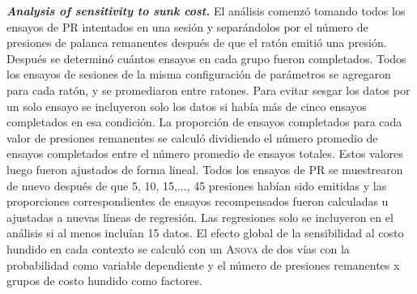 \documentclass[a4paper,12pt]{article}
\begin{document}
{\itshape\bfseries Analysis of sensitivity to sunk cost.} El análisis comenzó tomando todos los ensayos de PR intentados en una sesión y separándolos por el número de presiones de palanca remanentes después de que el ratón emitió una presión. Después se determinó cuántos ensayos en cada grupo fueron completados. Todos los ensayos de sesiones de la misma configuración de parámetros se agregaron para cada ratón, y se promediaron entre ratones. Para evitar sesgar  los datos por un solo ensayo se incluyeron solo los datos si había más de cinco ensayos completados en esa condición. La proporción de ensayos completados para cada valor de presiones remanentes se calculó dividiendo el número promedio de ensayos completados entre el número promedio de ensayos totales. Estos valores luego fueron ajustados de forma lineal. Todos los ensayos de PR se muestrearon de nuevo después de que 5, 10, 15,..., 45 presiones habían sido emitidas y las proporciones correspondientes de ensayos recompensados fueron calculadas u ajustadas a nuevas líneas de regresión. Las regresiones solo se incluyeron en el análisis si al menos incluían 15 datos. El efecto global de la sensibilidad al costo hundido en cada contexto se calculó con un {\scshape Anova} de dos vías con la probabilidad como variable dependiente y el número de presiones remanentes x grupos de costo hundido como factores. 
\end{document}
